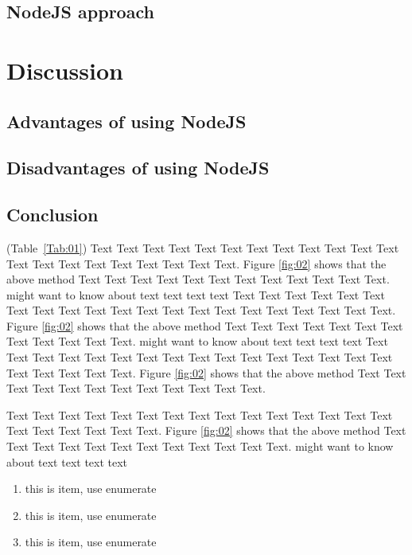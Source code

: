 \documentclass{bioinfo}
\begin{document}
\subsection{NodeJS approach}

\section{Discussion}
\subsection{Advantages of using NodeJS}
\subsection{Disadvantages of using NodeJS}

\subsection{Conclusion}

(Table~\ref{Tab:01}) Text Text Text Text Text Text  Text Text Text Text Text Text Text Text Text  Text Text Text Text Text Text. Figure \ref{fig:02} shows that the above method  Text Text Text Text  Text Text Text Text Text Text  Text Text.  \citealp{Boffelli03} might want to know about  text text text text
Text Text Text Text Text Text  Text Text Text Text Text Text Text Text Text  Text Text Text Text Text Text. Figure \ref{fig:02} shows that the above method  Text Text Text Text  Text Text Text Text Text Text  Text Text.  \citealp{Boffelli03} might want to know about  text text text text
Text Text Text Text Text Text  Text Text Text Text Text Text Text Text Text  Text Text Text Text Text Text. Figure \ref{fig:02} shows that the above method  Text Text Text Text  Text Text Text Text Text Text  Text Text.



Text Text Text Text Text Text  Text Text Text Text Text Text Text Text Text  Text Text Text Text Text Text. Figure \ref{fig:02} shows that the above method  Text Text Text Text  Text Text Text Text Text Text  Text Text.  \citealp{Boffelli03} might want to know about  text text text text





\begin{enumerate}
\item this is item, use enumerate
\item this is item, use enumerate
\item this is item, use enumerate
\end{enumerate}
\end{document}
